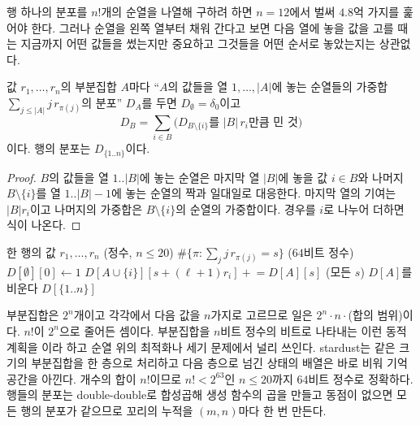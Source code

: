 행 하나의 분포를 $n!$개의 순열을 나열해 구하려 하면 $n=12$에서 벌써 $4.8$억 가지를 훑어야 한다. 그러나 순열을 왼쪽 열부터 채워 간다고 보면 다음 열에 놓을 값을 고를 때는 지금까지 어떤 값들을 썼는지만 중요하고 그것들을 어떤 순서로 놓았는지는 상관없다.

\begin{proposition}
\label{prop:bitmask}
값 $r_1,\dots,r_n$의 부분집합 $A$마다 ``$A$의 값들을 열 $1,\dots,|A|$에 놓는 순열들의 가중합 $\sum_{j\le|A|}j\,r_{\pi(j)}$의 분포'' $D_A$를 두면 $D_\emptyset=\delta_0$이고
\[
D_B=\sum_{i\in B}\bigl(D_{B\setminus\{i\}}\text{를 }|B|\,r_i\text{만큼 민 것}\bigr)
\]
이다. 행의 분포는 $D_{\{1..n\}}$이다.
\end{proposition}

\begin{proof}
$B$의 값들을 열 $1..|B|$에 놓는 순열은 마지막 열 $|B|$에 놓을 값 $i\in B$와 나머지 $B\setminus\{i\}$를 열 $1..|B|-1$에 놓는 순열의 짝과 일대일로 대응한다. 마지막 열의 기여는 $|B|r_i$이고 나머지의 가중합은 $B\setminus\{i\}$의 순열의 가중합이다. 경우를 $i$로 나누어 더하면 식이 나온다.
\end{proof}

\begin{algorithm}[htbp]
\begin{algorithmic}[1]
\Require 한 행의 값 $r_1,\dots,r_n$ (정수, $n\le20$)
\Ensure $\#\{\pi:\sum_jj\,r_{\pi(j)}=s\}$ ($64$비트 정수)
\State $D[\emptyset][0]\gets1$
     $D[A\cup\{i\}][s+(\ell+1)r_i]\mathrel{+}=D[A][s]$ (모든 $s$)
    \EndFor
    \State $D[A]$를 비운다 
  \EndFor
\EndFor
\State \Return $D[\{1..n\}]$
\end{algorithmic}
\caption{행 하나의 Page 통계량 분포를 세는 비트마스크 동적 계획 (stardust 의 )}
\label{alg:page}
\end{algorithm}

부분집합은 $2^n$개이고 각각에서 다음 값을 $n$가지로 고르므로 일은 $2^n\cdot n\cdot$(합의 범위)이다. $n!$이 $2^n$으로 줄어든 셈이다. 부분집합을 $n$비트 정수의 비트로 나타내는 이런 동적 계획을 이라 하고 순열 위의 최적화나 세기 문제에서 널리 쓰인다. stardust는 같은 크기의 부분집합을 한 층으로 처리하고 다음 층으로 넘긴 상태의 배열은 바로 비워 기억 공간을 아낀다. 개수의 합이 $n!$이므로 $n!<2^{63}$인 $n\le20$까지 $64$비트 정수로 정확하다. 행들의 분포는 double-double로 합성곱해 생성 함수의 곱을 만들고 동점이 없으면 모든 행의 분포가 같으므로 꼬리의 누적을 $(m,n)$마다 한 번 만든다.

